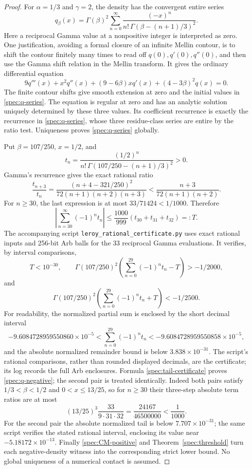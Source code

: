 \documentclass[11pt,a4paper]{article}
\theoremstyle{definition}
\theoremstyle{remark}
\numberwithin{equation}{section}
\begin{document}
\begin{proof}
For \(\alpha=1/3\) and \(\gamma=2\), the density has the convergent
entire series
\begin{equation}\label{spec:q-series}
 q_\beta(x)=\Gamma(\beta)^2\sum_{n=0}^\infty
    \frac{(-x)^n}{n!\,\Gamma(\beta-(n+1)/3)^2}.
\end{equation}
Here a reciprocal Gamma value at a nonpositive integer is interpreted
as zero.  One justification, avoiding a formal closure of an infinite
Mellin contour, is to shift the contour finitely many times to read
off \(q(0),q'(0),q''(0)\), and then use the Gamma shift relation in
the Mellin transform.  It gives the ordinary differential equation
\[
 9q'''(x)+x^2q''(x)+(9-6\beta)xq'(x)+(4-3\beta)^2q(x)=0.
\]
The finite contour shifts give smooth extension at zero and the
initial values in \eqref{spec:q-series}.  The equation is regular
at zero and has an analytic solution uniquely determined by these
three values.  Its coefficient recurrence is exactly the recurrence
in \eqref{spec:q-series}, whose three residue-class series are entire
by the ratio test.  Uniqueness proves \eqref{spec:q-series} globally.

Put \(\beta=107/250\), \(x=1/2\), and
\[
 t_n=\frac{(1/2)^n}{n!\,\Gamma(107/250-(n+1)/3)^2}>0.
\]
Gamma's recurrence gives the exact rational ratio
\[
 \frac{t_{n+3}}{t_n}
 =\frac{(n+4-321/250)^2}{72(n+1)(n+2)(n+3)}
 <\frac{n+3}{72(n+1)(n+2)}.
\]
For \(n\ge30\), the last expression is at most
\(33/71424<1/1000\).  Therefore
\begin{equation}\label{spec:tail-certificate}
 \left|\sum_{n=30}^\infty(-1)^nt_n\right|
 \le\frac{1000}{999}(t_{30}+t_{31}+t_{32})=:T.
\end{equation}
The accompanying script \texttt{leroy\_rational\_certificate.py}
uses exact rational inputs and 256-bit Arb balls for the 33 reciprocal
Gamma evaluations.  It verifies, by interval comparisons,
\[
 T<10^{-30},\qquad
 \Gamma(107/250)^2\left(\sum_{n=0}^{29}(-1)^nt_n-T\right)>-1/2000,
\]
and
\[
 \Gamma(107/250)^2\left(\sum_{n=0}^{29}(-1)^nt_n+T\right)<-1/2500.
\]
For readability, the normalized partial sum is enclosed by the short
decimal interval
\[
 -9.6084728959550860\times10^{-5}
 <\sum_{n=0}^{29}(-1)^nt_n
 <-9.6084728959550858\times10^{-5},
\]
and the absolute normalized remainder bound is below
\(3.838\times10^{-31}\).  The script's rational comparisons, rather
than rounded displayed decimals, are the certificate; its log records
the full Arb enclosures.  Formula
\eqref{spec:tail-certificate} proves \eqref{spec:q-negative};
the second pair is treated identically.  Indeed both pairs satisfy
\(1/3<\beta<1/2\) and \(0<x\le13/25\), so for \(n\ge30\) their
three-step absolute term ratios are at most
\[
 (13/25)^3\frac{33}{9\cdot31\cdot32}
          =\frac{24167}{46500000}<\frac1{1000}.
\]
For the second pair the absolute normalized tail is below
\(7.707\times10^{-31}\); the same script verifies the stated rational
interval, enclosing its value near \(-5.18172\times10^{-13}\).
Finally \eqref{spec:CM-positive} and Theorem~\ref{spec:threshold}
turn each negative-density witness into the corresponding strict lower
bound.  No global uniqueness of a numerical contact is assumed.
\end{proof}
\end{document}
